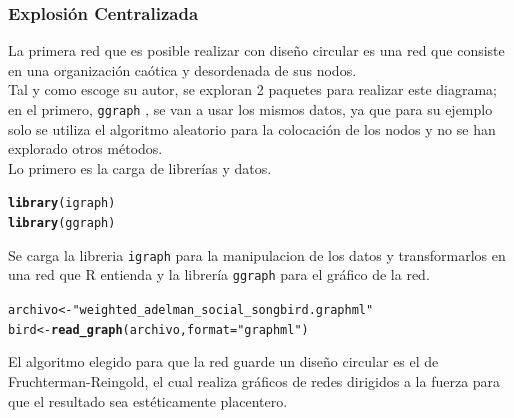\documentclass{article}\usepackage[]{graphicx}\usepackage[]{color}
\makeatletter
\newcommand{\hlstr}[1]{\textcolor[rgb]{0.192,0.494,0.8}{#1}}%
\newcommand{\hlstd}[1]{\textcolor[rgb]{0.345,0.345,0.345}{#1}}%
\newcommand{\hlkwb}[1]{\textcolor[rgb]{0.69,0.353,0.396}{#1}}%
\newcommand{\hlkwc}[1]{\textcolor[rgb]{0.333,0.667,0.333}{#1}}%
\newcommand{\hlkwd}[1]{\textcolor[rgb]{0.737,0.353,0.396}{\textbf{#1}}}%
\newenvironment{kframe}{%
 \def\at@end@of@kframe{}%
 \ifinner\ifhmode%
  \def\at@end@of@kframe{\end{minipage}}%
  \begin{minipage}{\columnwidth}%
 \fi\fi%
 \def\FrameCommand##1{\hskip\@totalleftmargin \hskip-\fboxsep
 \colorbox{shadecolor}{##1}\hskip-\fboxsep
     \hskip-\linewidth \hskip-\@totalleftmargin \hskip\columnwidth}%
 \MakeFramed {\advance\hsize-\width
   \@totalleftmargin\z@ \linewidth\hsize
   \@setminipage}}%
 {\par\unskip\endMakeFramed%
 \at@end@of@kframe}
\newenvironment{knitrout}{}{} %
\makeatother
\begin{document}
\subsubsection{Explosi\'on Centralizada}
La primera red que es posible realizar con dise\~no circular es una red que consiste en una organizaci\'on ca\'otica y desordenada de sus nodos.~\\
Tal y como escoge su autor, se exploran 2 paquetes para realizar este diagrama; en el primero, \texttt{ggraph} %
, se van a usar los mismos datos, ya que para su ejemplo solo se utiliza el algoritmo aleatorio para la colocaci\'on de los nodos y no se han explorado otros m\'etodos.~\\
Lo primero es la carga de librer\'ias y datos.
\begin{knitrout}
\color{fgcolor}\begin{kframe}
\begin{alltt}
\hlkwd{library}\hlstd{(igraph)}
\hlkwd{library}\hlstd{(ggraph)}
\end{alltt}
\end{kframe}
\end{knitrout}
Se carga la libreria \texttt{igraph} %
para la manipulacion de los datos y transformarlos en una red que R entienda y la librer\'ia \texttt{ggraph} para el gr\'afico de la red.
\begin{knitrout}
\color{fgcolor}\begin{kframe}
\begin{alltt}
\hlstd{archivo} \hlkwb{<-}\hlstr{"weighted_adelman_social_songbird.graphml"}
\hlstd{bird} \hlkwb{<-} \hlkwd{read_graph}\hlstd{( archivo ,} \hlkwc{format} \hlstd{=}\hlstr{"graphml"}\hlstd{)}
\end{alltt}
\end{kframe}
\end{knitrout}
El algoritmo elegido para que la red guarde un dise\~no circular es el de Fruchterman-Reingold, el cual realiza gr\'aficos de redes dirigidos a la fuerza para que el resultado sea est\'eticamente placentero.
\end{document}
